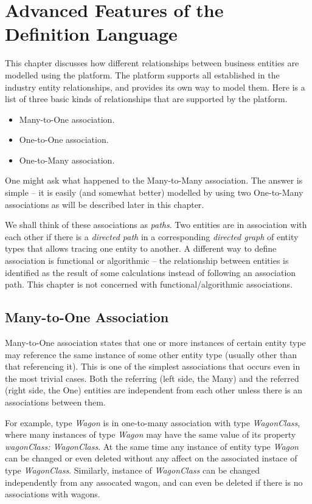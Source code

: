 \chapter{Advanced Features of the Definition Language}\label{ch01:02}

  This chapter discusses how different relationships between business entities are modelled using the platform.
  The platform supports all established in the industry entity relationships, and provides its own way to model them. 
  Here is a list of three basic kinds of relationships that are supported by the platform.
  \begin{itemize}
    \item Many-to-One association.
    \item One-to-One association.
    \item One-to-Many association.
  \end{itemize}

  One might ask what happened to the Many-to-Many association. 
  The answer is simple -- it is easily (and somewhat better) modelled by using two One-to-Many associations as will be described later in this chapter.

  We shall think of these associations as \emph{paths}.
  Two entities are in association with each other if there is a \emph{directed path} in a corresponding \emph{directed graph} of entity types that allows tracing one entity to another. 
  A different way to define association is functional or algorithmic -- the relationship between entities is identified as the result of some calculations instead of following an association path. 
  This chapter is not concerned with functional/algorithmic associations.  

\section{Many-to-One Association}

  Many-to-One association states that one or more instances of certain entity type may reference the same instance of some other entity type (usually other than that referencing it). 
  This is one of the simplest associations that occurs even in the most trivial cases.
  Both the referring (left side, the Many) and the referred (right side, the One) entities are independent from each other unless there is an associations between them.

  For example, type \emph{Wagon} is in one-to-many association with type \emph{WagonClass}, where many instances of type \emph{Wagon} may have the same value of its property \emph{wagonClass: WagonClass}.
  At the same time any instance of entity type \emph{Wagon} can be changed or even deleted without any affect on the associated instace of type \emph{WagonClass}.
  Similarly, instance of \emph{WagonClass} can be changed independently from any assocated wagon, and can even be deleted if there is no associations with wagons.

